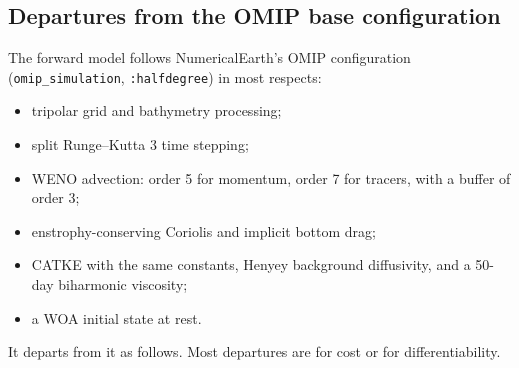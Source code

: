 \documentclass[10pt]{article}
\begin{document}
\subsection{Departures from the OMIP base configuration}
\label{sec:departures}

The forward model follows NumericalEarth's OMIP configuration (\texttt{omip\_simulation}, \texttt{:halfdegree})
in most respects:
\begin{itemize}
  \item tripolar grid and bathymetry processing;
  \item split Runge--Kutta 3 time stepping;
  \item WENO advection: order 5 for momentum, order 7 for tracers, with a buffer of order 3;
  \item enstrophy-conserving Coriolis and implicit bottom drag;
  \item CATKE with the same constants, Henyey background diffusivity, and a 50-day biharmonic viscosity;
  \item a WOA initial state at rest.
\end{itemize}
It departs from it as follows. Most departures are for cost or for differentiability.
\end{document}
